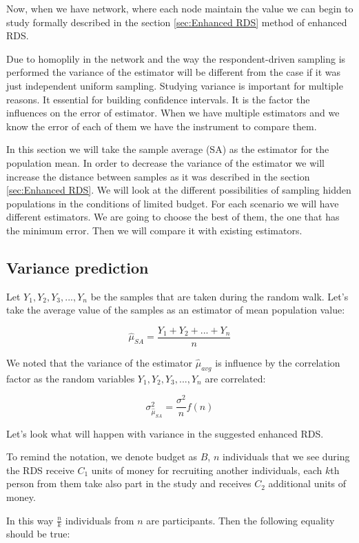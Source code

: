 \documentclass[12pt]{report}
\begin{document}
Now, when we have network, where each node maintain the value we can begin to study formally described in the section 
\ref{sec:Enhanced RDS} method of enhanced RDS.

Due to homoplily in the network and the way the respondent-driven sampling is performed the variance of the estimator will be different from the case if it was just independent uniform sampling. Studying variance is important for multiple reasons. It essential for building confidence intervals. It is the factor the influences on the error of estimator. When we have multiple estimators and we know the error of each of them we have the instrument to compare them.


In this section we will take the sample average (SA) as the estimator for the population mean. In order to decrease the variance of the estimator we will increase the distance between samples as it was described in the section \ref{sec:Enhanced RDS}. We will look at the different possibilities of sampling hidden populations in the conditions of limited budget. For each scenario we will have different estimators. We are going to choose the best of them, the one that has the minimum error. Then we will compare it with existing estimators.

\subsection{Variance prediction}

Let $Y_1, Y_2, Y_3,..., Y_n$ be the samples that are taken during the random walk. Let's take the average value of the samples as an estimator of mean population value:

$$ \widehat{\mu}_{SA} = \frac{Y_1 + Y_2 + ... + Y_n}{n}$$

We noted that the variance of the estimator $\widehat{\mu}_{avg}$ is influence by the correlation factor as the random variables $Y_1, Y_2, Y_3,..., Y_n$ are correlated:

$$ \sigma^2_{\hat{\mu}_{SA}} = \frac{\sigma^2}{n} f(n)$$

Let's look what will happen with variance in the suggested enhanced RDS.

To remind the notation, we denote budget as $B$, $n$ individuals that we see during the RDS receive $C_1$ units of money for recruiting another individuals, each $k$th person from them take also part in the study and receives $C_2$ additional units of money. 

In this way $\frac{n}{k}$ individuals from $n$ are participants. Then the following equality should be true:
\end{document}
